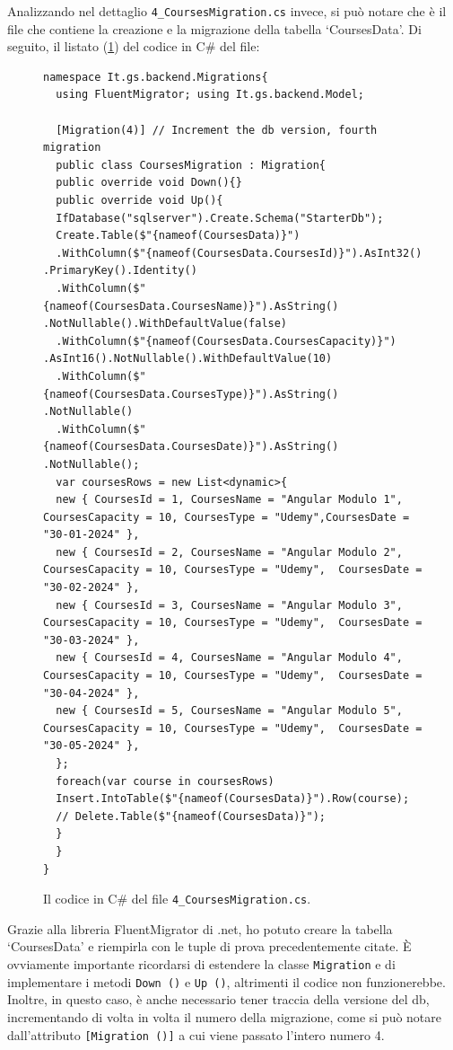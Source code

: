 Analizzando nel dettaglio \texttt{4\_CoursesMigration.cs} invece, si può notare che è il file che contiene la creazione e la migrazione della tabella `CoursesData'. Di seguito, il listato (\ref{fig:coursemigration}) del codice in C\# del file:
\begin{figure}[H]
\begin{lstlisting}[label={lst:coursemigration}, linewidth=20cm, basicstyle=\tiny]
namespace It.gs.backend.Migrations{
  using FluentMigrator; using It.gs.backend.Model;

  [Migration(4)] // Increment the db version, fourth migration
  public class CoursesMigration : Migration{
  public override void Down(){}
  public override void Up(){
  IfDatabase("sqlserver").Create.Schema("StarterDb");
  Create.Table($"{nameof(CoursesData)}")
  .WithColumn($"{nameof(CoursesData.CoursesId)}").AsInt32() .PrimaryKey().Identity()
  .WithColumn($"{nameof(CoursesData.CoursesName)}").AsString() .NotNullable().WithDefaultValue(false)
  .WithColumn($"{nameof(CoursesData.CoursesCapacity)}") .AsInt16().NotNullable().WithDefaultValue(10)
  .WithColumn($"{nameof(CoursesData.CoursesType)}").AsString() .NotNullable()
  .WithColumn($"{nameof(CoursesData.CoursesDate)}").AsString() .NotNullable();
  var coursesRows = new List<dynamic>{
  new { CoursesId = 1, CoursesName = "Angular Modulo 1", CoursesCapacity = 10, CoursesType = "Udemy",CoursesDate = "30-01-2024" },
  new { CoursesId = 2, CoursesName = "Angular Modulo 2", CoursesCapacity = 10, CoursesType = "Udemy",  CoursesDate = "30-02-2024" },
  new { CoursesId = 3, CoursesName = "Angular Modulo 3", CoursesCapacity = 10, CoursesType = "Udemy",  CoursesDate = "30-03-2024" },
  new { CoursesId = 4, CoursesName = "Angular Modulo 4", CoursesCapacity = 10, CoursesType = "Udemy",  CoursesDate = "30-04-2024" },
  new { CoursesId = 5, CoursesName = "Angular Modulo 5", CoursesCapacity = 10, CoursesType = "Udemy",  CoursesDate = "30-05-2024" },
  };
  foreach(var course in coursesRows)
  Insert.IntoTable($"{nameof(CoursesData)}").Row(course);
  // Delete.Table($"{nameof(CoursesData)}");
  }
  }
}
\end{lstlisting}
\caption{\label{fig:coursemigration}Il codice in C\# del file \texttt{4\_CoursesMigration.cs}.}
\end{figure}
Grazie alla libreria FluentMigrator di \gls{.net}, ho potuto creare la tabella `CoursesData' e riempirla con le tuple di prova precedentemente citate. È ovviamente importante ricordarsi di estendere la classe \texttt{Migration} e di implementare i metodi \texttt{Down ()} e \texttt{Up ()}, altrimenti il codice non funzionerebbe. Inoltre, in questo caso, è anche necessario tener traccia della versione del \acrshort{db}, incrementando di volta in volta il numero della migrazione, come si può notare dall'attributo \texttt{[Migration ()]} a cui viene passato l'intero numero 4.
